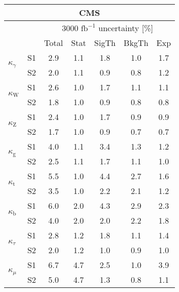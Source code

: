 \begin{tabular}{@{} l c c@{\hskip 0.15in} c c c c @{}}
 \hline
   \multicolumn{7}{c}{CMS}\\
 \hline
  &  & \multicolumn{5}{c}{3000 $\text{fb}^{-1}$ uncertainty [\%]} \\
  &  & Total & Stat & SigTh & BkgTh & Exp \\
 \hline
\multirow{2}{*}{$\kappa_{\gamma }$} & S1  & 2.9& 1.1 & 1.8 & 1.0 & 1.7  \\[1pt]
                        & S2  & 2.0& 1.1 & 0.9 & 0.8 & 1.2  \\[4pt]
\multirow{2}{*}{$\kappa_{\mathrm{W}}$} & S1  & 2.6& 1.0 & 1.7 & 1.1 & 1.1  \\[1pt]
                        & S2  & 1.8& 1.0 & 0.9 & 0.8 & 0.8  \\[4pt]
\multirow{2}{*}{$\kappa_{\mathrm{Z}}$} & S1  & 2.4& 1.0 & 1.7 & 0.9 & 0.9  \\[1pt]
                        & S2  & 1.7& 1.0 & 0.9 & 0.7 & 0.7  \\[4pt]
\multirow{2}{*}{$\kappa_{\mathrm{g}}$} & S1  & 4.0& 1.1 & 3.4 & 1.3 & 1.2  \\[1pt]
                        & S2  & 2.5& 1.1 & 1.7 & 1.1 & 1.0  \\[4pt]
\multirow{2}{*}{$\kappa_{\mathrm{t}}$} & S1  & 5.5& 1.0 & 4.4 & 2.7 & 1.6  \\[1pt]
                        & S2  & 3.5& 1.0 & 2.2 & 2.1 & 1.2  \\[4pt]
\multirow{2}{*}{$\kappa_{\mathrm{b}}$} & S1  & 6.0& 2.0 & 4.3 & 2.9 & 2.3  \\[1pt]
                        & S2  & 4.0& 2.0 & 2.0 & 2.2 & 1.8  \\[4pt]
\multirow{2}{*}{$\kappa_{\tau }$} & S1  & 2.8& 1.2 & 1.8 & 1.1 & 1.4  \\[1pt]
                        & S2  & 2.0& 1.2 & 1.0 & 0.9 & 1.0  \\[4pt]
\multirow{2}{*}{$\kappa_{\mu}$} & S1  & 6.7& 4.7 & 2.5 & 1.0 & 3.9  \\[1pt]
                        & S2  & 5.0& 4.7 & 1.3 & 0.8 & 1.1  \\[4pt]
\hline
\end{tabular}